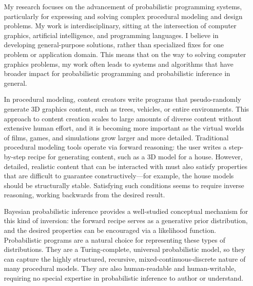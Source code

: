 \documentclass[
11pt, %
a4paper, %
oneside, %
headinclude,footinclude, %
BCOR5mm, %
]{scrartcl}
\title{\normalfont\spacedallcaps{Daniel Ritchie}} %
\author{\spacedallcaps{Research Statement}} %
\date{} %
\begin{document}

\pagestyle{scrheadings}
\clearscrheadings
\newcommand{\headertext}{\spacedlowsmallcaps{\color{black} Daniel Ritchie \color{halfgray} Research Statement}}
\ohead{\headertext}
\cfoot[\pagemark]{\pagemark}


\maketitle

My research focuses on the advancement of probabilistic programming systems, particularly for expressing and solving complex procedural modeling and design problems. My work is interdisciplinary, sitting at the intersection of computer graphics, artificial intelligence, and programming languages. I believe in developing general-purpose solutions, rather than specialized fixes for one problem or application domain. This means that on the way to solving computer graphics problems, my work often leads to systems and algorithms that have broader impact for probabilistic programming and probabilistic inference in general.

In procedural modeling, content creators write programs that pseudo-randomly generate 3D graphics content, such as trees, vehicles, or entire environments. This approach to content creation scales to large amounts of diverse content without extensive human effort, and it is becoming more important as the virtual worlds of films, games, and simulations grow larger and more detailed. Traditional procedural modeling tools operate via forward reasoning: the user writes a step-by-step recipe for generating content, such as a 3D model for a house. However, detailed, realistic content that can be interacted with must also satisfy properties that are difficult to guarantee constructively—for example, the house models should be structurally stable. Satisfying such conditions seems to require inverse reasoning, working backwards from the desired result.

Bayesian probabilistic inference provides a well-studied conceptual mechanism for this kind of inversion: the forward recipe serves as a generative prior distribution, and the desired properties can be encouraged via a likelihood function. Probabilistic programs are a natural choice for representing these types of distributions. They are a Turing-complete, universal probabilistic model, so they can capture the highly structured, recursive, mixed-continuous-discrete nature of many procedural models. They are also human-readable and human-writable, requiring no special expertise in probabilistic inference to author or understand.
\end{document}
